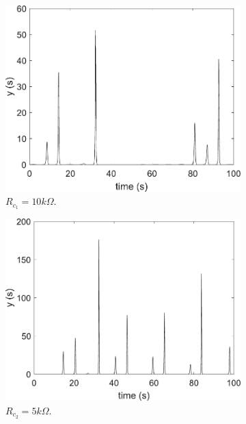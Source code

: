 	    \begin{figure}
        \centering
        \begin{subfigure}[b]{0.22\textwidth}
            \centering
            \includegraphics[scale=0.28]{figs/paraCdown/outParaC10.pdf}
            \caption{$R_{c_1} = 10k\Omega$.}    
        \end{subfigure}
        \begin{subfigure}[b]{0.22\textwidth}  
            \centering 
            \includegraphics[scale=0.28]{figs/paraCdown/outParaC5.pdf}
            \caption{$R_{c_2} = 5k\Omega$.}  
        \end{subfigure}
        \begin{subfigure}[b]{0.22\textwidth}

\end{subfigure}
\end{figure}
